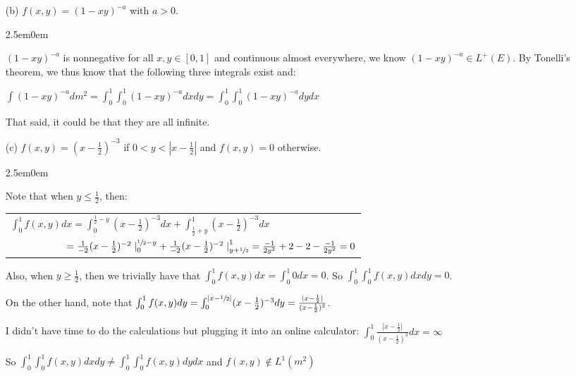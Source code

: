\documentclass{book}
\newcommand{\exTwoP}{%
   \color{RedViolet}%
   \fontsize{13}{15}\selectfont%
}
\newenvironment{myIndent}{%
   \begin{adjustwidth}{2.5em}{0em}%
}{%
   \end{adjustwidth}%
}
\newcommand{\retTwo}{\hfill\bigbreak}
\begin{document}
\begin{enumerate}
\begin{myIndent}
		So, our function is not integrable with respect to $m^2$.\retTwo
	\end{myIndent}

	\item[(b)] $f(x, y) = (1 - xy)^{-a}$ with $a > 0$.
	
	\begin{myIndent}\exTwoP
		$(1 - xy)^{-a}$ is nonnegative for all $x, y \in [0, 1]$ and continuous almost everywhere, we know $(1 - xy)^{-a} \in L^+(E)$. By Tonelli's theorem, we thus know that the following three integrals exist and:

		{\centering $\int (1-xy)^{-a}dm^2 = \int_0^1 \int_0^1 (1-xy)^{-a}dxdy = \int_0^1 \int_0^1 (1-xy)^{-a}dydx$ \retTwo\par}

		That said, it could be that they are all infinite.\retTwo
	\end{myIndent}

	\item[(c)] $f(x, y) = (x - \frac{1}{2})^{-3}$ if $0 < y < |x - \frac{1}{2}|$ and $f(x, y) = 0$ otherwise.  
	
	\begin{myIndent}\exTwoP
		Note that when $y \leq \frac{1}{2}$, then:
		
		{\centering 
		\begin{tabular}{l}
			$\int_0^1 f(x, y)dx = \int_0^{\frac{1}{2}-y}(x-\frac{1}{2})^{-3}dx + \int_{\frac{1}{2} + y}^1(x-\frac{1}{2})^{-3}dx$\\

			$\phantom{\int_0^1 f(x, y)dx} = \frac{1}{-2}(x-\frac{1}{2})^{-2}\left.\right|_0^{\sfrac{1}{2}-y} + \frac{1}{-2}(x-\frac{1}{2})^{-2}\left.\right|_{y+\sfrac{1}{2}}^{1} = \frac{-1}{2y^2} + 2 - 2 - \frac{-1}{2y^2} = 0$
		\end{tabular}\retTwo\par}

		Also, when $y \geq \frac{1}{2}$, then we trivially have that $\int_0^1 f(x, y)dx = \int_0^1 0dx = 0$. So $\int_0^1 \int_0^1 f(x, y)dxdy = 0$.
		\retTwo

		On the other hand, note that $\int_0^1 f(x, y)dy = \int_0^{|x - \sfrac{1}{2}|} (x - \frac{1}{2})^{-3}dy = \frac{|x-\frac{1}{2}|}{(x-\frac{1}{2})^3}$.\retTwo

		I didn't have time to do the calculations but plugging it into an online calculator: $\int_0^1 \frac{|x-\frac{1}{2}|}{(x-\frac{1}{2})^3}dx = \infty$

		So $\int_0^1\int_0^1 f(x, y)dxdy \neq \int_0^1\int_0^1 f(x, y)dydx$ and $f(x, y) \notin L^1(m^2)$

		\newpage

	\end{myIndent}

\end{enumerate}
\end{document}
